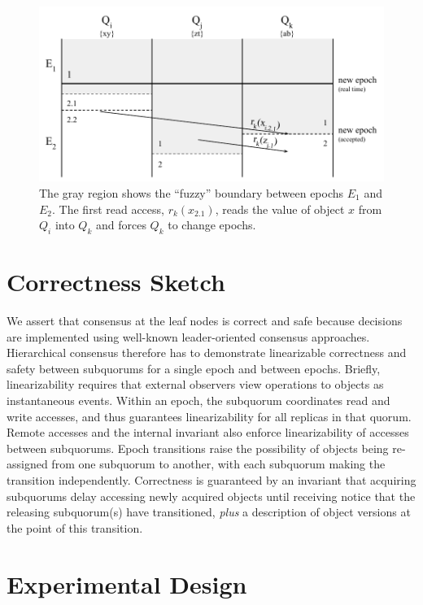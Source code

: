 \documentclass[sigconf]{acmart}
\begin{document}
\begin{figure}[t]
    \centering
    \includegraphics[height=0.2\textheight]{figures/fuzzy}
    \caption{The gray region shows the ``fuzzy'' boundary between epochs $E_1$
      and $E_2$. The first read access, $r_k(x_{2.1})$, reads the value of object $x$ from $Q_i$ into
      $Q_k$ and forces $Q_k$ to change epochs.}
    \label{fig:fuzzy}
\end{figure}

\section{Correctness Sketch}

We assert that consensus at the leaf nodes is correct and safe because decisions are
implemented using well-known leader-oriented consensus approaches.
Hierarchical consensus therefore has to demonstrate linearizable correctness and safety
between subquorums for a single epoch and between epochs.
Briefly, linearizability requires that external observers view operations to objects as
instantaneous events.
Within an epoch, the subquorum coordinates read and write accesses, and thus guarantees
linearizability for all replicas in that quorum.
Remote accesses and the internal invariant also enforce linearizability of accesses
between subquorums.
Epoch transitions raise the possibility of objects being re-assigned from one subquorum to
another, with each subquorum making the transition independently. Correctness is
guaranteed by an invariant that acquiring subquorums delay accessing newly acquired objects
until receiving notice that the releasing subquorum(s) have transitioned, \emph{plus} a
description of object versions at the point of this transition.


\section{Experimental Design}
\end{document}
